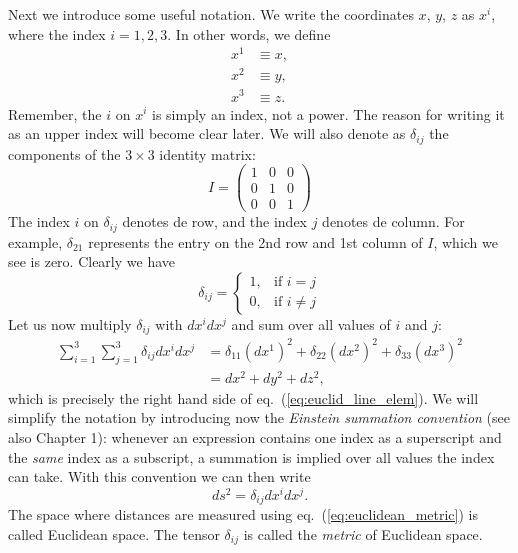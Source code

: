 Next we introduce some useful notation. We write the coordinates $x$, $y$, $z$ as $x^i$, where the index $i=1,2,3$. In other words, we define
\begin{equation}
\begin{split}
x^1&\equiv x,\\
x^2&\equiv y,\\
x^3&\equiv z.
\end{split}
\end{equation}
Remember, the $i$ on $x^i$ is simply an index, not a power. The reason for writing it as an upper index will become clear later. We will also denote as $\delta_{ij}$ the components of the $3\times3$ identity matrix:
\begin{equation}
I=\left( \begin{array}{ccc} 1 & 0 & 0 \\ 
0 & 1 & 0 \\
0 & 0 & 1 \end{array} \right)
\end{equation}
The index $i$ on $\delta_{ij}$ denotes de row, and the index $j$ denotes de column. For example, $\delta_{21}$ represents the entry on the 2nd row and 1st column of $I$, which we see is zero. Clearly we have
\begin{equation}
\delta_{ij}=\begin{cases} 1, & \mbox{if $i=j$} \\ 
0, & \mbox{if $i\neq j$} \end{cases}
\end{equation}
Let us now multiply $\delta_{ij}$ with $dx^i dx^j$ and sum over all values of $i$ and $j$:
\begin{equation}
\begin{split}
\sum_{i=1}^3\sum_{j=1}^3 \delta_{ij}dx^i dx^j &= \delta_{11}(dx^1)^2+\delta_{22}(dx^2)^2+\delta_{33}(dx^3)^2\\
&= dx^2+dy^2+dz^2,
\end{split}
\end{equation}
which is precisely the right hand side of eq.\ (\ref{eq:euclid_line_elem}). We will simplify the notation by introducing now the {\it Einstein summation convention} (see also Chapter 1): whenever an expression contains one index as a superscript and the {\it same} index as a subscript, a summation is implied over all values the index can take. With this convention we can then write
\begin{equation} \label{eq:euclidean_metric}
ds^2=\delta_{ij}dx^i dx^j.
\end{equation}
The space where distances are measured using eq.\ (\ref{eq:euclidean_metric}) is called Euclidean space. The tensor $\delta_{ij}$ is called the {\it metric} of Euclidean space.

